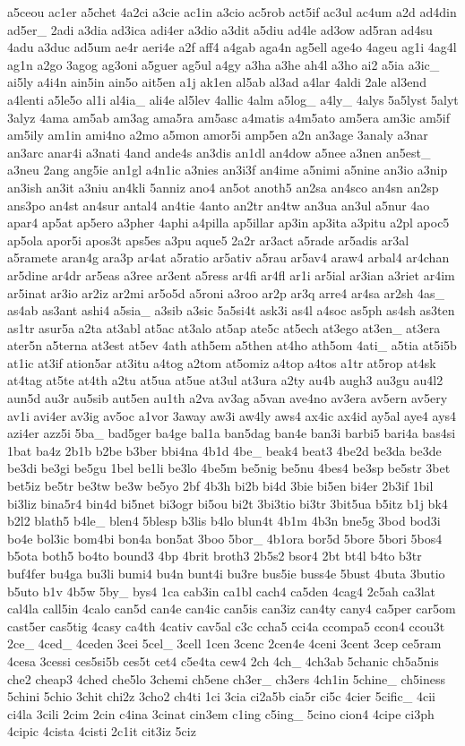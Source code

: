 {a5ceou ac1er a5chet 4a2ci a3cie ac1in a3cio ac5rob act5if ac3ul ac4um a2d ad4din ad5er\-\_\- 2adi a3dia ad3ica adi4er a3dio a3dit a5diu ad4le ad3ow ad5ran ad4su 4adu a3duc ad5um ae4r aeri4e a2f aff4 a4gab aga4n ag5ell age4o 4ageu ag1i 4ag4l ag1n a2go 3agog ag3oni a5guer ag5ul a4gy a3ha a3he ah4l a3ho ai2 a5ia a3ic\-\_\- ai5ly a4i4n ain5in ain5o ait5en a1j ak1en al5ab al3ad a4lar 4aldi 2ale al3end a4lenti a5le5o al1i al4ia\-\_\- ali4e al5lev 4allic 4alm a5log\-\_\- a4ly\-\_\- 4alys 5a5lyst 5alyt 3alyz 4ama am5ab am3ag ama5ra am5asc a4matis a4m5ato am5era am3ic am5if am5ily am1in ami4no a2mo a5mon amor5i amp5en a2n an3age 3analy a3nar an3arc anar4i a3nati 4and ande4s an3dis an1dl an4dow a5nee a3nen an5est\-\_\- a3neu 2ang ang5ie an1gl a4n1ic a3nies an3i3f an4ime a5nimi a5nine an3io a3nip an3ish an3it a3niu an4kli 5anniz ano4 an5ot anoth5 an2sa an4sco an4sn an2sp ans3po an4st an4sur antal4 an4tie 4anto an2tr an4tw an3ua an3ul a5nur 4ao apar4 ap5at ap5ero a3pher 4aphi a4pilla ap5illar ap3in ap3ita a3pitu a2pl apoc5 ap5ola apor5i apos3t aps5es a3pu aque5 2a2r ar3act a5rade ar5adis ar3al a5ramete aran4g ara3p ar4at a5ratio ar5ativ a5rau ar5av4 araw4 arbal4 ar4chan ar5dine ar4dr ar5eas a3ree ar3ent a5ress ar4fi ar4fl ar1i ar5ial ar3ian a3riet ar4im ar5inat ar3io ar2iz ar2mi ar5o5d a5roni a3roo ar2p ar3q arre4 ar4sa ar2sh 4as\-\_\- as4ab as3ant ashi4 a5sia\-\_\- a3sib a3sic 5a5si4t ask3i as4l a4soc as5ph as4sh as3ten as1tr asur5a a2ta at3abl at5ac at3alo at5ap ate5c at5ech at3ego at3en\-\_\- at3era ater5n a5terna at3est at5ev 4ath ath5em a5then at4ho ath5om 4ati\-\_\- a5tia at5i5b at1ic at3if ation5ar at3itu a4tog a2tom at5omiz a4top a4tos a1tr at5rop at4sk at4tag at5te at4th a2tu at5ua at5ue at3ul at3ura a2ty au4b augh3 au3gu au4l2 aun5d au3r au5sib aut5en au1th a2va av3ag a5van ave4no av3era av5ern av5ery av1i avi4er av3ig av5oc a1vor 3away aw3i aw4ly aws4 ax4ic ax4id ay5al aye4 ays4 azi4er azz5i 5ba\-\_\- bad5ger ba4ge bal1a ban5dag ban4e ban3i barbi5 bari4a bas4si 1bat ba4z 2b1b b2be b3ber bbi4na 4b1d 4be\-\_\- beak4 beat3 4be2d be3da be3de be3di be3gi be5gu 1bel be1li be3lo 4be5m be5nig be5nu 4bes4 be3sp be5str 3bet bet5iz be5tr be3tw be3w be5yo 2bf 4b3h bi2b bi4d 3bie bi5en bi4er 2b3if 1bil bi3liz bina5r4 bin4d bi5net bi3ogr bi5ou bi2t 3bi3tio bi3tr 3bit5ua b5itz b1j bk4 b2l2 blath5 b4le\-\_\- blen4 5blesp b3lis b4lo blun4t 4b1m 4b3n bne5g 3bod bod3i bo4e bol3ic bom4bi bon4a bon5at 3boo 5bor\-\_\- 4b1ora bor5d 5bore 5bori 5bos4 b5ota both5 bo4to bound3 4bp 4brit broth3 2b5s2 bsor4 2bt bt4l b4to b3tr buf4fer bu4ga bu3li bumi4 bu4n bunt4i bu3re bus5ie buss4e 5bust 4buta 3butio b5uto b1v 4b5w 5by\-\_\- bys4 1ca cab3in ca1bl cach4 ca5den 4cag4 2c5ah ca3lat cal4la call5in 4calo can5d can4e can4ic can5is can3iz can4ty cany4 ca5per car5om cast5er cas5tig 4casy ca4th 4cativ cav5al c3c ccha5 cci4a ccompa5 ccon4 ccou3t 2ce\-\_\- 4ced\-\_\- 4ceden 3cei 5cel\-\_\- 3cell 1cen 3cenc 2cen4e 4ceni 3cent 3cep ce5ram 4cesa 3cessi ces5si5b ces5t cet4 c5e4ta cew4 2ch 4ch\-\_\- 4ch3ab 5chanic ch5a5nis che2 cheap3 4ched che5lo 3chemi ch5ene ch3er\-\_\- ch3ers 4ch1in 5chine\-\_\- ch5iness 5chini 5chio 3chit chi2z 3cho2 ch4ti 1ci 3cia ci2a5b cia5r ci5c 4cier 5cific\-\_\- 4cii ci4la 3cili 2cim 2cin c4ina 3cinat cin3em c1ing c5ing\-\_\- 5cino cion4 4cipe ci3ph 4cipic 4cista 4cisti 2c1it cit3iz 5ciz }
